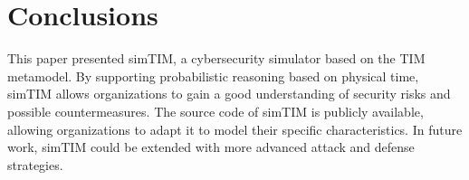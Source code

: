 \documentclass{llncs}
\begin{document}
\section{Conclusions}

This paper presented simTIM, a cybersecurity simulator based on the TIM metamodel.
By supporting probabilistic reasoning based on physical time, simTIM allows organizations to gain a good understanding of security risks and possible countermeasures.
The source code of simTIM is publicly available, allowing organizations to adapt it to model their specific characteristics.
In future work, simTIM could be extended with more advanced attack and defense strategies.%



\end{document}
